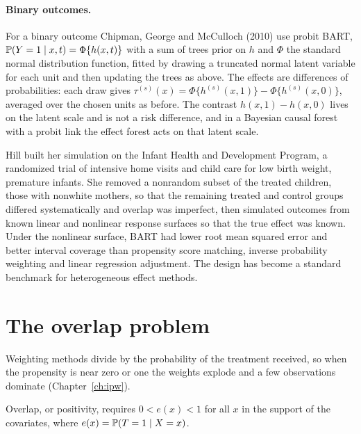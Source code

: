 \paragraph{Binary outcomes.} For a binary outcome Chipman, George and McCulloch (2010) use probit BART, $\mathbb{P}(Y = 1 \mid x, t) = \Phi\{h(x, t)\}$ with a sum of trees prior on $h$ and $\Phi$ the standard normal distribution function, fitted by drawing a truncated normal latent variable for each unit and then updating the trees as above. The effects are differences of probabilities: each draw gives $\tau^{(s)}(x) = \Phi\{h^{(s)}(x, 1)\} - \Phi\{h^{(s)}(x, 0)\}$, averaged over the chosen units as before. The contrast $h(x, 1) - h(x, 0)$ lives on the latent scale and is not a risk difference, and in a Bayesian causal forest with a probit link the effect forest acts on that latent scale.

\begin{example}
Hill built her simulation on the Infant Health and Development Program, a randomized trial of intensive home visits and child care for low birth weight, premature infants. She removed a nonrandom subset of the treated children, those with nonwhite mothers, so that the remaining treated and control groups differed systematically and overlap was imperfect, then simulated outcomes from known linear and nonlinear response surfaces so that the true effect was known. Under the nonlinear surface, BART had lower root mean squared error and better interval coverage than propensity score matching, inverse probability weighting and linear regression adjustment. The design has become a standard benchmark for heterogeneous effect methods.
\end{example}



\section{The overlap problem}

Weighting methods divide by the probability of the treatment received, so when the propensity is near zero or one the weights explode and a few observations dominate (Chapter~\ref{ch:ipw}).

\begin{definition}[Overlap]
Overlap, or positivity, requires $0 < e(x) < 1$ for all $x$ in the support of the covariates, where $e(x) = \mathbb{P}(T = 1 \mid X = x)$.
\end{definition}

